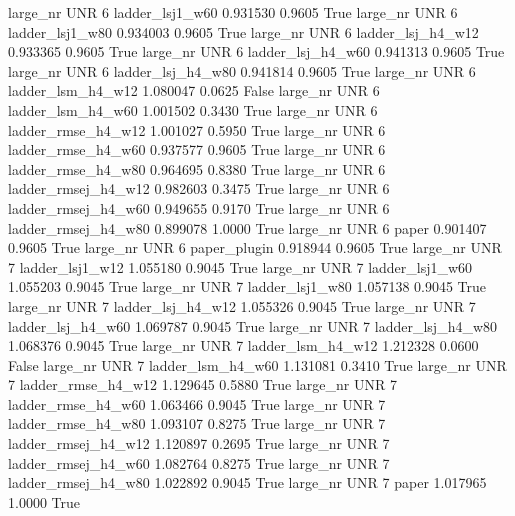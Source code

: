  large_nr      UNR                 6     ladder_lsj1_w60   0.931530      0.9605    True
  large_nr      UNR                 6     ladder_lsj1_w80   0.934003      0.9605    True
  large_nr      UNR                 6   ladder_lsj_h4_w12   0.933365      0.9605    True
  large_nr      UNR                 6   ladder_lsj_h4_w60   0.941313      0.9605    True
  large_nr      UNR                 6   ladder_lsj_h4_w80   0.941814      0.9605    True
  large_nr      UNR                 6   ladder_lsm_h4_w12   1.080047      0.0625   False
  large_nr      UNR                 6   ladder_lsm_h4_w60   1.001502      0.3430    True
  large_nr      UNR                 6  ladder_rmse_h4_w12   1.001027      0.5950    True
  large_nr      UNR                 6  ladder_rmse_h4_w60   0.937577      0.9605    True
  large_nr      UNR                 6  ladder_rmse_h4_w80   0.964695      0.8380    True
  large_nr      UNR                 6 ladder_rmsej_h4_w12   0.982603      0.3475    True
  large_nr      UNR                 6 ladder_rmsej_h4_w60   0.949655      0.9170    True
  large_nr      UNR                 6 ladder_rmsej_h4_w80   0.899078      1.0000    True
  large_nr      UNR                 6               paper   0.901407      0.9605    True
  large_nr      UNR                 6        paper_plugin   0.918944      0.9605    True
  large_nr      UNR                 7     ladder_lsj1_w12   1.055180      0.9045    True
  large_nr      UNR                 7     ladder_lsj1_w60   1.055203      0.9045    True
  large_nr      UNR                 7     ladder_lsj1_w80   1.057138      0.9045    True
  large_nr      UNR                 7   ladder_lsj_h4_w12   1.055326      0.9045    True
  large_nr      UNR                 7   ladder_lsj_h4_w60   1.069787      0.9045    True
  large_nr      UNR                 7   ladder_lsj_h4_w80   1.068376      0.9045    True
  large_nr      UNR                 7   ladder_lsm_h4_w12   1.212328      0.0600   False
  large_nr      UNR                 7   ladder_lsm_h4_w60   1.131081      0.3410    True
  large_nr      UNR                 7  ladder_rmse_h4_w12   1.129645      0.5880    True
  large_nr      UNR                 7  ladder_rmse_h4_w60   1.063466      0.9045    True
  large_nr      UNR                 7  ladder_rmse_h4_w80   1.093107      0.8275    True
  large_nr      UNR                 7 ladder_rmsej_h4_w12   1.120897      0.2695    True
  large_nr      UNR                 7 ladder_rmsej_h4_w60   1.082764      0.8275    True
  large_nr      UNR                 7 ladder_rmsej_h4_w80   1.022892      0.9045    True
  large_nr      UNR                 7               paper   1.017965      1.0000    True
